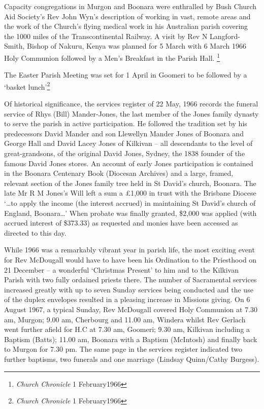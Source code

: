 Capacity congregations in Murgon and Boonara were enthralled by Bush Church Aid Society's Rev John Wyn's description of working in vast, remote areas and the work of the Church's flying medical work in his Australian parish covering the 1000 miles of the Transcontinental Railway. A visit by Rev N Langford-Smith, Bishop of Nakuru, Kenya was planned for 5 March with 6 March 1966 Holy Communion followed by a Men's Breakfast in the Parish Hall. \footnote{\emph{Church Chronicle} 1 February1966}


The Easter Parish Meeting was set for 1 April in Goomeri to be followed by a `basket lunch'\footnote{\emph{Church Chronicle} 1 February1966}


Of historical significance, the services register of 22 May, 1966 records the funeral service of Rhys (Bill) Mander-Jones, the last member of the Jones family dynasty to serve the parish in active participation. He followed the tradition set by his predecessors David Mander and son Llewellyn Mander Jones of Boonara and George Hall and David Lacey Jones of Kilkivan -- all descendants to the level of great-grandsons, of the original David Jones, Sydney, the 1838 founder of the famous David Jones stores. An account of early Jones participation is contained in the Boonara Centenary Book (Diocesan Archives) and a large, framed, relevant section of the Jones family tree held in St David's church, Boonara. The late Mr R M Jones's Will left a sum a \pounds1,000 in trust with the Brisbane Diocese `\ldots to apply the income (the interest accrued) in maintaining St David's church of England, Boonara\ldots' When probate was finally granted, \$2,000 was applied (with accrued interest of \$373.33) as requested and monies have been accessed as directed to this day.



While 1966 was a remarkably vibrant year in parish life, the most exciting event for Rev McDougall would have to have been his Ordination to the Priesthood on 21 December -- a wonderful `Christmas Present' to him and to the Kilkivan Parish with two fully ordained priests there. The number of Sacramental services increased greatly with up to seven Sunday services being conducted and the use of the duplex envelopes resulted in a pleasing increase in Missions giving. On 6 August 1967, a typical Sunday, Rev McDougall covered Holy Communion at 7.30 am, Murgon; 9.00 am, Cherbourg and 11.00 am, Windera whilst Rev Gerlach went further afield for H.C at 7.30 am, Goomeri; 9.30 am, Kilkivan including a Baptism (Batts); 11.00 am, Boonara with a Baptism (McIntosh) and finally back to Murgon for 7.30 pm. The same page in the services register indicated two further baptisms, two funerals and one marriage (Lindsay Quinn/Cathy Burgess).









